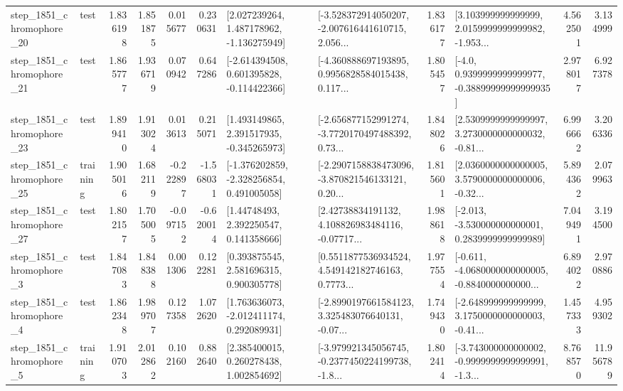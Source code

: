 \begin{tabular}{llrrrrllrlrr}
 step\_1851\_chromophore\_20 &      test &      1.836198 &    1.851875 &      0.015677 &  0.230631 &    [2.027239264, 1.487178962, -1.136275949] &  [-3.528372914050207, -2.007616441610715, 2.056... &       1.836177 &  [3.103999999999999, 2.0159999999999982, -1.953... &            4.562501 &          3.134999 \\
 step\_1851\_chromophore\_21 &      test &      1.865777 &    1.936719 &      0.070942 &  0.647286 &   [-2.614394508, 0.601395828, -0.114422366] &  [-4.360888697193895, 0.9956828584015438, 0.117... &       1.805457 &   [-4.0, 0.9399999999999977, -0.38899999999999935] &            2.978017 &          6.927378 \\
 step\_1851\_chromophore\_23 &      test &      1.899410 &    1.913024 &      0.013613 &  0.215071 &    [1.493149865, 2.391517935, -0.345265973] &  [-2.656877152991274, -3.7720170497488392, 0.73... &       1.848026 &  [2.5309999999999997, 3.2730000000000032, -0.81... &            6.996662 &          3.206336 \\
 step\_1851\_chromophore\_25 &  training &      1.905016 &    1.682119 &     -0.222897 & -1.568031 &   [-1.376202859, -2.328256854, 0.491005058] &  [-2.2907158838473096, -3.870821546133121, 0.20... &       1.815601 &  [2.0360000000000005, 3.5790000000000006, -0.32... &            5.894362 &          2.079963 \\
 step\_1851\_chromophore\_27 &      test &      1.802157 &    1.705005 &     -0.097152 & -0.620014 &      [1.44748493, 2.392250547, 0.141358666] &  [2.42738834191132, 4.108826983484116, -0.07717... &       1.988618 &   [-2.013, -3.530000000000001, 0.2839999999999989] &            7.049491 &          3.194500 \\
  step\_1851\_chromophore\_3 &      test &      1.847083 &    1.848388 &      0.001306 &  0.122281 &     [0.393875545, 2.581696315, 0.900305778] &  [0.5511877536934524, 4.549142182746163, 0.7773... &       1.977554 &  [-0.611, -4.0680000000000005, -0.8840000000000... &            6.894022 &          2.970886 \\
  step\_1851\_chromophore\_4 &      test &      1.862348 &    1.989707 &      0.127358 &  1.072620 &    [1.763636073, -2.012411174, 0.292089931] &  [-2.8990197661584123, 3.325483076640131, -0.07... &       1.749430 &  [-2.648999999999999, 3.1750000000000003, -0.41... &            1.457333 &          4.959302 \\
  step\_1851\_chromophore\_5 &  training &      1.910703 &    2.012862 &      0.102160 &  0.882640 &     [2.385400015, 0.260278438, 1.002854692] &  [-3.979921345056745, -0.2377450224199738, -1.8... &       1.802414 &  [-3.743000000000002, -0.9999999999999991, -1.3... &            8.768570 &         11.956789 \\

\end{tabular}
